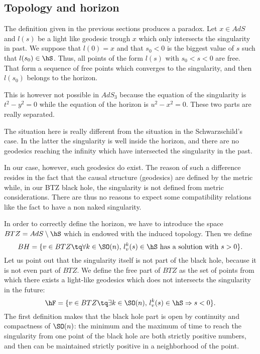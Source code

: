 \subsection{Topology and horizon}
\label{subSecTopoHor}

The definition given in the previous sections produces a paradox. Let $x\in AdS$ and $l(s)$ be a light like geodesic trough $x$ which only intersects the singularity in past. We suppose that $l(0)=x$ and that $s_0<0$ is the biggest value of $s$ such that $l(s_0)\in \hS$. Thus, all points of the form $l(s)$ with $s_0<s<0$ are free. That form a sequence of free points which converges to the singularity, and then $l(s_0)$ belongs to the horizon.

This is however not possible in $AdS_3$ because the equation of the singularity is $t^2-y^2=0$ while the equation of the horizon is $u^2-x^2=0$. These two parts are really separated.

The situation here is really different from the situation in the Schwarzschild's case. In the latter the singularity is well inside the horizon, and there are no geodesics reaching the infinity which have intersected the singularity in the past.

In our case, however, such geodesics do exist. The reason of such a difference resides in the fact that the causal structure (geodesics) are defined by the metric while, in our BTZ black hole, the singularity is not defined from metric considerations. There are thus no reasons to expect some compatibility relations like the fact to have a non naked singularity.

In order to correctly define the horizon, we have to introduce the space $BTZ=AdS\setminus\hS$ which in endowed with the induced topology. Then we define
\begin{equation}
	BH=\{ v\in BTZ\tq\forall k\in \SO(n),\, l_v^k(s)\in\hS\text{ has a solution with }s>0 \}.
\end{equation}
Let us point out that the singularity itself is not part of the black hole, because it is not even part of $BTZ$. We define the free part of $BTZ$ as the set of points from which there exists a light-like geodesics which does not intersects the singularity in the future:
\begin{equation}
	\hF=\{ v\in BTZ\tq\exists k\in \SO(n),\, l_v^k(s)\in\hS\Rightarrow s<0 \}.
\end{equation}
The first definition makes that the black hole part is open by continuity and compactness of $\SO(n)$: the minimum and the maximum of time to reach the singularity from one point of the black hole are both strictly positive numbers, and then can be maintained strictly positive in a neighborhood of the point.

